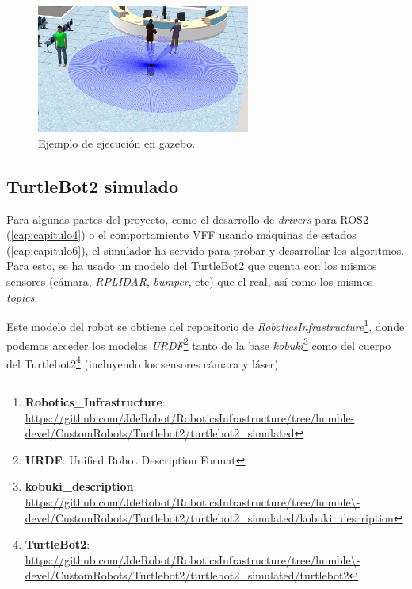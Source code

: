 \begin{figure} [H]
    \begin{center}
        \includegraphics[width=7cm]{figs/c3/gazebo_sim.png}
    \end{center}
    \caption[Simulador Gazebo.]{Ejemplo de ejecución en gazebo.}
    \label{fig:gazebo_example}
\end{figure}

\subsection{TurtleBot2 simulado}
\label{subsec:turtlebot2_sim}

Para algunas partes del proyecto, como el desarrollo de \textit{drivers} para ROS2 (\ref{cap:capitulo4}) o el comportamiento VFF usando
máquinas de estados (\ref{cap:capitulo6}), el simulador ha servido para probar y desarrollar los algoritmos. Para esto, se ha usado un modelo del
TurtleBot2 que cuenta con los mismos sensores (cámara, \textit{RPLIDAR}, \textit{bumper}, etc) que el real, así como los mismos \textit{topics}.

Este modelo del robot se obtiene del repositorio de
\textit{RoboticsInfrastructure}\footnote{\textbf{Robotics\_Infrastructure}: \url{
    https://github.com/JdeRobot/RoboticsInfrastructure/tree/humble-devel/CustomRobots/Turtlebot2/turtlebot2_simulated}},
donde podemos acceder los modelos \textit{URDF}\footnote{\textbf{URDF}: Unified Robot Description Format} tanto de la base
\textit{kobuki}\footnote{\textbf{kobuki\_description}: \url{
    https://github.com/JdeRobot/RoboticsInfrastructure/tree/humble\-devel/CustomRobots/Turtlebot2/turtlebot2_simulated/kobuki_description}}
como del cuerpo del Turtlebot2\footnote{\textbf{TurtleBot2}: \url{
    https://github.com/JdeRobot/RoboticsInfrastructure/tree/humble\-devel/CustomRobots/Turtlebot2/turtlebot2_simulated/turtlebot2}}
(incluyendo los sensores cámara y láser).

